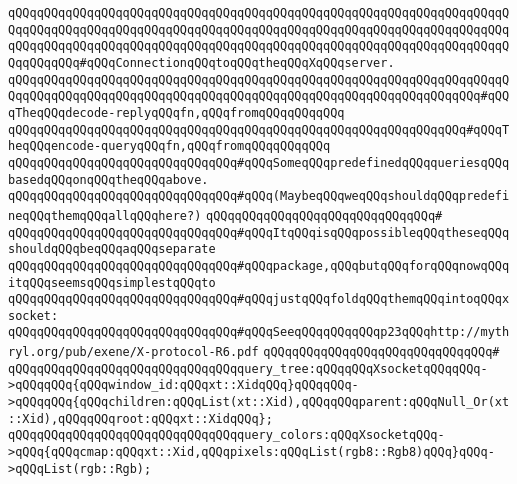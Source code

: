 \verb|qQQqqQQqqQQqqQQqqQQqqQQqqQQqqQQqqQQqqQQqqQQqqQQqqQQqqQQqqQQqqQQqqQQqqQQqqQQqqQQqqQQqqQQqqQQqqQQqqQQqqQQqqQQqqQQqqQQqqQQqqQQqqQQqqQQqqQQqqQQqqQQqqQQqqQQqqQQqqQQqqQQqqQQqqQQqqQQqqQQqqQQqqQQqqQQqqQQqqQQqqQQqqQQqqQQqqQQqqQQq#qQQqConnectionqQQqtoqQQqtheqQQqXqQQqserver.|\newline
\verb|qQQqqQQqqQQqqQQqqQQqqQQqqQQqqQQqqQQqqQQqqQQqqQQqqQQqqQQqqQQqqQQqqQQqqQQqqQQqqQQqqQQqqQQqqQQqqQQqqQQqqQQqqQQqqQQqqQQqqQQqqQQqqQQqqQQqqQQq#qQQqTheqQQqdecode-replyqQQqfn,qQQqfromqQQqqQQqqQQq|\newline
\verb|qQQqqQQqqQQqqQQqqQQqqQQqqQQqqQQqqQQqqQQqqQQqqQQqqQQqqQQqqQQqqQQq#qQQqTheqQQqencode-queryqQQqfn,qQQqfromqQQqqQQqqQQq|\newline
\newline
\verb|qQQqqQQqqQQqqQQqqQQqqQQqqQQqqQQq#qQQqSomeqQQqpredefinedqQQqqueriesqQQqbasedqQQqonqQQqtheqQQqabove.|\newline
\verb|qQQqqQQqqQQqqQQqqQQqqQQqqQQqqQQq#qQQq(MaybeqQQqweqQQqshouldqQQqpredefineqQQqthemqQQqallqQQqhere?)|\newline
\verb|qQQqqQQqqQQqqQQqqQQqqQQqqQQqqQQq#|\newline
\verb|qQQqqQQqqQQqqQQqqQQqqQQqqQQqqQQq#qQQqItqQQqisqQQqpossibleqQQqtheseqQQqshouldqQQqbeqQQqaqQQqseparate|\newline
\verb|qQQqqQQqqQQqqQQqqQQqqQQqqQQqqQQq#qQQqpackage,qQQqbutqQQqforqQQqnowqQQqitqQQqseemsqQQqsimplestqQQqto|\newline
\verb|qQQqqQQqqQQqqQQqqQQqqQQqqQQqqQQq#qQQqjustqQQqfoldqQQqthemqQQqintoqQQqxsocket:|\newline
\newline
\verb|qQQqqQQqqQQqqQQqqQQqqQQqqQQqqQQq#qQQqSeeqQQqqQQqqQQqp23qQQqhttp://mythryl.org/pub/exene/X-protocol-R6.pdf|\newline
\verb|qQQqqQQqqQQqqQQqqQQqqQQqqQQqqQQq#|\newline
\verb|qQQqqQQqqQQqqQQqqQQqqQQqqQQqqQQqquery_tree:qQQqqQQqXsocketqQQqqQQq->qQQqqQQq{qQQqwindow_id:qQQqxt::XidqQQq}qQQqqQQq->qQQqqQQq{qQQqchildren:qQQqList(xt::Xid),qQQqqQQqparent:qQQqNull_Or(xt::Xid),qQQqqQQqroot:qQQqxt::XidqQQq};|\newline
\newline
\verb|qQQqqQQqqQQqqQQqqQQqqQQqqQQqqQQqquery_colors:qQQqXsocketqQQq->qQQq{qQQqcmap:qQQqxt::Xid,qQQqpixels:qQQqList(rgb8::Rgb8)qQQq}qQQq->qQQqList(rgb::Rgb);|\newline
